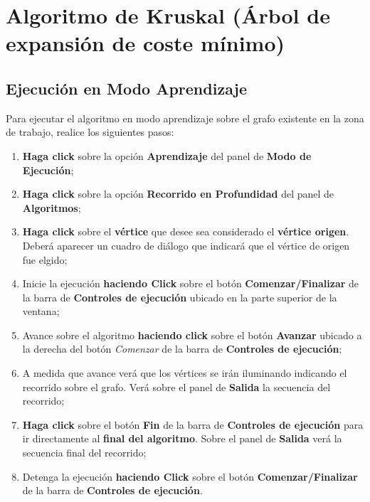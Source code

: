 \documentclass{book}
\begin{document}
%
%
\chapter{Algoritmo de Kruskal (Árbol de expansión de coste mínimo)}


\section{Ejecución en Modo Aprendizaje}

Para ejecutar el algoritmo en modo aprendizaje sobre el grafo existente en la zona de trabajo, realice los siguientes pasos:
\medskip

\begin{enumerate}
	\itemsep=8pt \topsep=0pt \partopsep=0pt \parskip=0pt \parsep=0pt

	\item \textbf{Haga click} sobre la opción \textbf{Aprendizaje} del panel de \textbf{Modo de Ejecución};

	\item \textbf{Haga click} sobre la opción \textbf{Recorrido en Profundidad} del panel de \textbf{Algoritmos};

	\item \textbf{Haga click} sobre el \textbf{vértice} que desee sea considerado el \textbf{vértice origen}. Deberá aparecer un cuadro de diálogo que indicará que el vértice de origen fue elgido;

	\item Inicie la ejecución \textbf{haciendo Click} sobre el botón \textbf{Comenzar/Finalizar} de la barra de \textbf{Controles de ejecución} ubicado en la parte superior de la ventana;

	\item Avance sobre el algoritmo \textbf{haciendo click} sobre el botón \textbf{Avanzar} ubicado a la derecha del botón \textit{Comenzar} de la barra de \textbf{Controles de ejecución};

	\item A medida que avance verá que los vértices se irán iluminando indicando el recorrido sobre el grafo. Verá sobre el panel de \textbf{Salida} la secuencia del recorrido;

	\item \textbf{Haga click} sobre el botón \textbf{Fin} de la barra de \textbf{Controles de ejecución} para ir directamente al \textbf{final del algoritmo}. Sobre el panel de \textbf{Salida} verá la secuencia final del recorrido;

	\item Detenga la ejecución \textbf{haciendo Click} sobre el botón \textbf{Comenzar/Finalizar} de la barra de \textbf{Controles de ejecución}.

\end{enumerate}
\medskip
\end{document}
